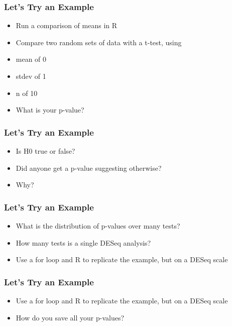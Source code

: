 \documentclass[14pt,handout]{beamer}
\begin{document}
\begin{frame}
\frametitle{Let's Try an Example}
\begin{itemize}
	\item Run a comparison of means in R
	\item Compare two random sets of data with a t-test, using
	\ttfamily
	\footnotesize
	\sffamily
	\item[] mean of 0
	\item[] stdev of 1
	\item[] n of 10
	\item What is your p-value?
\end{itemize}
\end{frame}

\begin{frame}
\frametitle{Let's Try an Example}
\begin{itemize}
	\item<+-> Is H0 true or false?
	\item<+-> Did anyone get a p-value suggesting otherwise?
	\item<+-> Why?
\end{itemize}
\end{frame}

\begin{frame}
\frametitle{Let's Try an Example}
\begin{itemize}
	\item<+-> What is the distribution of p-values over many tests?
	\item<+-> How many tests is a single DESeq analysis?
	\item<+-> Use a for loop and R to replicate the example, but on a DESeq scale
\end{itemize}
\end{frame}

\begin{frame}
\frametitle{Let's Try an Example}
\begin{itemize}
	\item[] Use a for loop and R to replicate the example, but on a DESeq scale
	\ttfamily
	\footnotesize
{} 
	\normalsize
	\sffamily
	\item[] How do you save all your p-values?
\end{itemize}
\end{frame}
\end{document}

